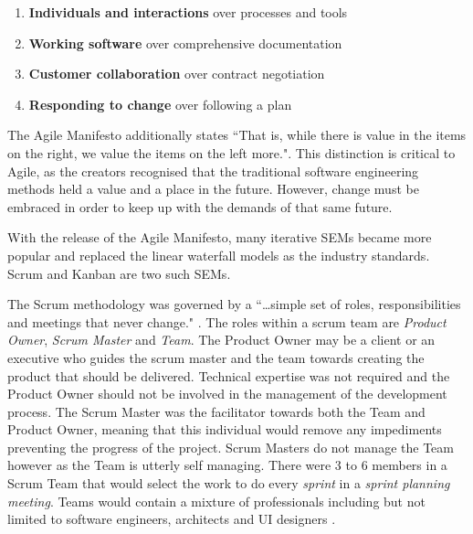 \documentclass[final]{cmpreport}
\begin{document}
			\begin{enumerate}
				\item \textbf{Individuals and interactions} over processes and tools
				\item \textbf{Working software} over comprehensive documentation
				\item \textbf{Customer collaboration} over contract negotiation
				\item \textbf{Responding to change} over following a plan 
			\end{enumerate}
		
			The Agile Manifesto additionally states ``That is, while there is value in the items on the right, we value the items on the left more.". This distinction is critical to Agile, as the creators recognised that the traditional software engineering methods held a value and a place in the future. However, change must be embraced in order to keep up with the demands of that same future.
			
			With the release of the Agile Manifesto, many iterative SEMs became more popular and replaced the linear waterfall models as the industry standards. Scrum and Kanban are two such SEMs. 
			
			The Scrum methodology was governed by a ``\ldots simple set of roles, responsibilities and meetings that never change." \citep{scrum-online}. The roles within a scrum team are \emph{Product Owner}, \emph{Scrum Master} and \emph{Team}. The Product Owner may be a client or an executive who guides the scrum master and the team towards creating the product that should be delivered. Technical expertise was not required and the Product Owner should not be involved in the management of the development process. The Scrum Master was the facilitator towards both the Team and Product Owner, meaning that this individual would remove any impediments preventing the progress of the project. Scrum Masters do not manage the Team however as the Team is utterly self managing. There were 3 to 6 members in a Scrum Team that would select the work to do every \emph{sprint} in a \emph{sprint planning meeting}. Teams would contain a mixture of professionals including but not limited to software engineers, architects and UI designers \citep{Scrum}. 
			
\end{document}
